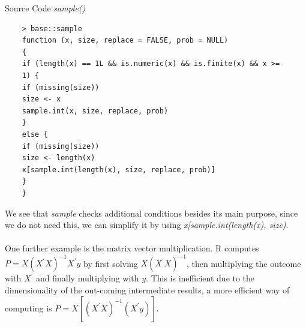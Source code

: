 \documentclass[Research_Module_ES.tex]{subfiles}
\begin{document}
\begin{table}[h]
	\caption{Source Code {\itshape sample()}}\label{sample}
	\begin{lstlisting}
	> base::sample
	function (x, size, replace = FALSE, prob = NULL) 
	{
	if (length(x) == 1L && is.numeric(x) && is.finite(x) && x >= 
	1) {
	if (missing(size)) 
	size <- x
	sample.int(x, size, replace, prob)
	}
	else {
	if (missing(size)) 
	size <- length(x)
	x[sample.int(length(x), size, replace, prob)]	
	}
	}
	\end{lstlisting}
\end{table}
We see that {\itshape sample} checks additional conditions besides its main purpose, since we do not need this, we can simplify it by using {\itshape x[sample.int(length(x), size)}.\\
\\
One further example is the matrix vector multiplication. R computes $P=X(X^\prime X)^{-1}X^\prime y$ by first solving $X(X^\prime X)^{-1}$, then multiplying the outcome with $X^\prime$ and finally multiplying with $y$. This is inefficient due to the dimensionality of the out-coming intermediate results, a more efficient way of computing is $P=X[ (X^\prime X)^{-1}(X^\prime y)]$.
\end{document}
